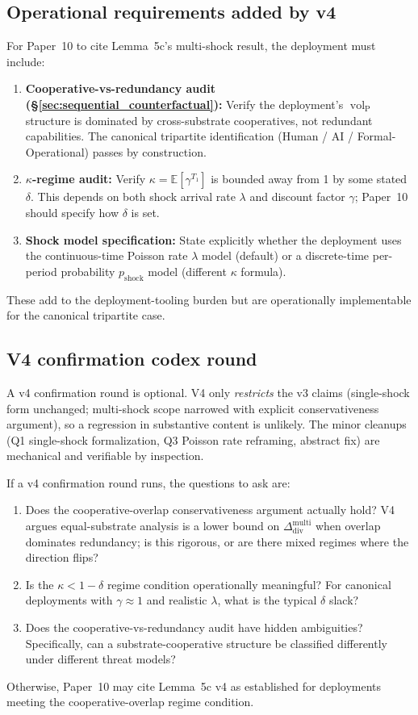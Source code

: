 \documentclass{article}
\DeclareMathOperator{\vol}{vol}
\newcommand{\volL}{{\vol_{\mathrm{P}}}}
\newcommand{\Ddiv}{\Delta_{\mathrm{div}}}
\newcommand{\pshock}{p_{\mathrm{shock}}}
\begin{document}
\subsection{Operational requirements added by v4}

For Paper~10 to cite Lemma~5c's multi-shock result, the deployment
must include:

\begin{enumerate}
\item \textbf{Cooperative-vs-redundancy audit
  (\S\ref{sec:sequential_counterfactual}):} Verify the deployment's
  $\volL$ structure is dominated by cross-substrate cooperatives, not
  redundant capabilities.  The canonical tripartite identification
  (Human / AI / Formal-Operational) passes by construction.

\item \textbf{$\kappa$-regime audit:}  Verify $\kappa = \mathbb{E}[\gamma^{T_1}]$
  is bounded away from 1 by some stated $\delta$.  This depends on
  both shock arrival rate $\lambda$ and discount factor $\gamma$;
  Paper~10 should specify how $\delta$ is set.

\item \textbf{Shock model specification:}  State explicitly whether
  the deployment uses the continuous-time Poisson rate $\lambda$
  model (default) or a discrete-time per-period probability
  $\pshock$ model (different $\kappa$ formula).
\end{enumerate}

These add to the deployment-tooling burden but are operationally
implementable for the canonical tripartite case.

\subsection{V4 confirmation codex round}

A v4 confirmation round is optional.  V4 only \emph{restricts} the
v3 claims (single-shock form unchanged; multi-shock scope narrowed
with explicit conservativeness argument), so a regression in
substantive content is unlikely.  The minor cleanups (Q1 single-shock
formalization, Q3 Poisson rate reframing, abstract fix) are
mechanical and verifiable by inspection.

If a v4 confirmation round runs, the questions to ask are:
\begin{enumerate}
\item Does the cooperative-overlap conservativeness argument
  actually hold? V4 argues equal-substrate analysis is a lower bound
  on $\Ddiv^{\mathrm{multi}}$ when overlap dominates redundancy; is
  this rigorous, or are there mixed regimes where the direction
  flips?
\item Is the $\kappa < 1 - \delta$ regime condition operationally
  meaningful? For canonical deployments with $\gamma \approx 1$ and
  realistic $\lambda$, what is the typical $\delta$ slack?
\item Does the cooperative-vs-redundancy audit have hidden
  ambiguities? Specifically, can a substrate-cooperative structure
  be classified differently under different threat models?
\end{enumerate}

Otherwise, Paper~10 may cite Lemma~5c v4 as established for
deployments meeting the cooperative-overlap regime condition.
\end{document}
